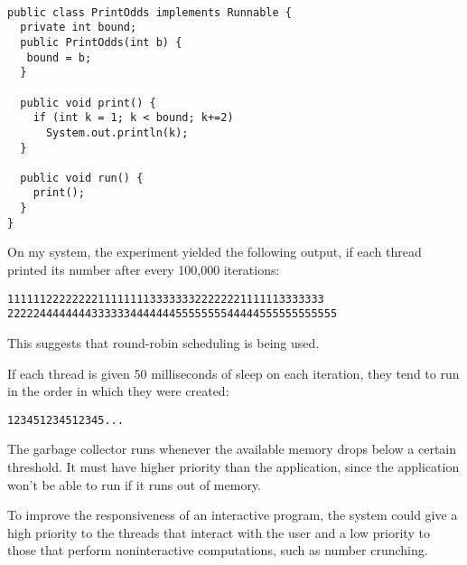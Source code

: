 \begin{ANS}
\item \mbox{ }

\begin{jjjlisting}
\begin{lstlisting}
public class PrintOdds implements Runnable {
  private int bound;
  public PrintOdds(int b) {
   bound = b;
  }

  public void print() {
    if (int k = 1; k < bound; k+=2)
      System.out.println(k);
  }

  public void run() {
    print();
  }
}
\end{lstlisting}
\end{jjjlisting}

\item  On my system, the experiment yielded the following output, if
each thread printed its number after every 100,000 iterations:

\begin{jjjlisting}
\begin{lstlisting}
1111112222222211111111333333322222221111113333333
222224444444433333344444445555555544444555555555555
\end{lstlisting}
\end{jjjlisting}

\noindent This suggests that round-robin scheduling
is being used.


\item  If each thread is given 50 milliseconds of sleep on each
iteration, they tend to run in the order in which they
were created:

\begin{jjjlisting}
\begin{lstlisting}
123451234512345...
\end{lstlisting}
\end{jjjlisting}

\item  The garbage collector runs whenever the available memory drops
below a certain threshold.  It must have higher priority than
the application, since the application won't be able to run
if it runs out of memory.


\item  To improve the responsiveness of an interactive program, the system
could give a high priority to the threads that interact with the user
and a low priority to those that perform noninteractive computations,
such as number crunching.


\end{ANS}
